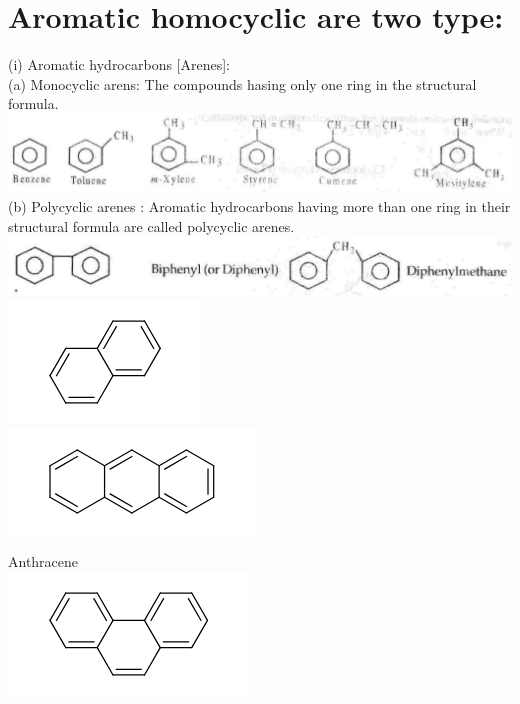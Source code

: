 \documentclass[10pt]{article}
\begin{document}
\section*{Aromatic homocyclic are two type:}
(i) Aromatic hydrocarbons [Arenes]:\\
(a) Monocyclic arens: The compounds hasing only one ring in the structural formula.\\
\includegraphics[max width=\textwidth, center]{2025_01_28_8470952b98110cec3aabg-202}\\
(b) Polycyclic arenes : Aromatic hydrocarbons having more than one ring in their structural formula are called polycyclic arenes.\\
\includegraphics[max width=\textwidth, center]{2025_01_28_8470952b98110cec3aabg-202(1)}\\
\includegraphics{smile-1462b3e951a587e53f4e9a02a92ccd284e78bd6a}\\
\includegraphics{smile-a2c0c1586d2e095e186b7215670fa55606098dbd}

Anthracene\\
\includegraphics{smile-1399a9c110fe34cc10823707a3fa6261dfe0f8f8}
\end{document}
